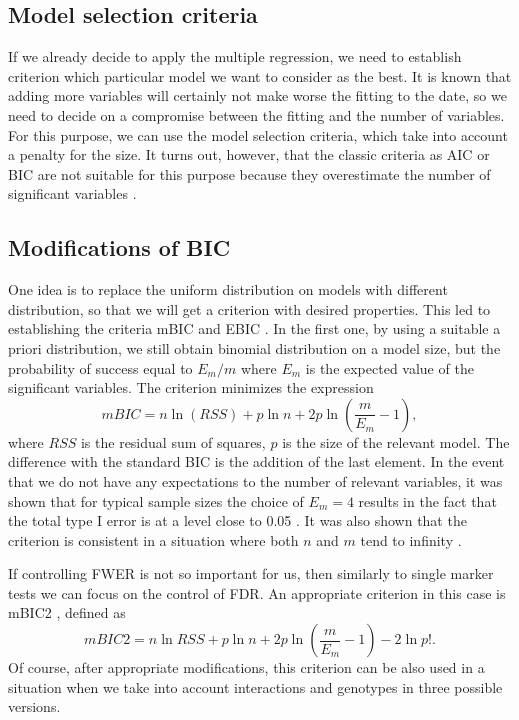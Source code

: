 \documentclass[]{MathAppl18}
\begin{document}
\subsection{Model selection criteria}
If we already decide to apply the multiple regression, we need to establish criterion which particular model we want to consider as the best. It is known that adding more variables will certainly not make worse the fitting to the date, so we need to decide on a compromise between the fitting and the number of variables. For this purpose, we can use the model selection criteria, which take into account a penalty for the size. It turns out, however, that the classic criteria as AIC \cite{YosKunTak1998:Heart} or BIC \cite{YosKunTak1998:Heart} are not suitable for this purpose because they overestimate the number of significant variables \cite{YosKunTak1998:Heart}.

\subsection{Modifications of BIC}
One idea is to replace the uniform distribution on models with different distribution, so that we will get a criterion with desired properties. This led to establishing the criteria mBIC \cite{SajMuhKaz2013:Bayes} and EBIC \cite{Var1975:Bayesian}. In the first one, by using a suitable a priori distribution, we still obtain binomial distribution on a model size, but the probability of success equal to $E_m/m$ where $E_m$ is the expected value of the significant variables. The criterion minimizes the expression 
$$mBIC = n\ln(RSS)+p\ln n+2p\ln\left(\frac{m}{E_m}-1\right),$$
where $RSS$ is the residual sum of squares, $p$ is the size of the relevant model. The difference with the standard BIC is the addition of the last element. In the event that we do not have any expectations to the number of relevant variables, it was shown that for typical sample sizes the choice of $E_m=4$ results in the fact that the total type I error is at a level close to 0.05 \cite{SajMuhKaz2013:Bayes}. It was also shown that the criterion is consistent in a situation where both $n$ and $m$ tend to infinity \cite{JasKor2011:Skladki}.

If controlling FWER is not so important for us, then similarly to single marker tests we can focus on the control of FDR. An appropriate criterion in this case is mBIC2 \cite{Jas2005:Zaufania}, defined as
$$mBIC2 = n\ln RSS + p \ln n +2p\ln\left(\frac {m}{E_m}-1\right) - 2\ln p!.$$
Of course, after appropriate modifications, this criterion can be also used in a situation when we take into account interactions and genotypes in three possible versions.
\end{document}

